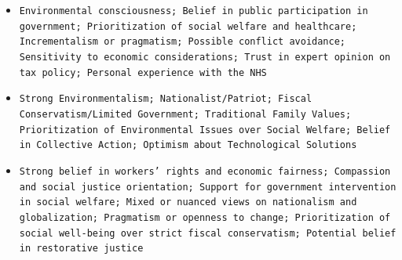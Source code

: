 \documentclass[11pt]{article}
\begin{document}
\begin{itemize}
\item \texttt{Environmental consciousness; Belief in public participation in government; Prioritization of social welfare and healthcare; Incrementalism or pragmatism; Possible conflict avoidance; Sensitivity to economic considerations; Trust in expert opinion on tax policy; Personal experience with the NHS}
\item \texttt{Strong Environmentalism; Nationalist/Patriot; Fiscal Conservatism/Limited Government; Traditional Family Values; Prioritization of Environmental Issues over Social Welfare; Belief in Collective Action; Optimism about Technological Solutions}
\item \texttt{Strong belief in workers' rights and economic fairness; Compassion and social justice orientation; Support for government intervention in social welfare; Mixed or nuanced views on nationalism and globalization; Pragmatism or openness to change; Prioritization of social well-being over strict fiscal conservatism; Potential belief in restorative justice}
\end{itemize}
\end{document}
